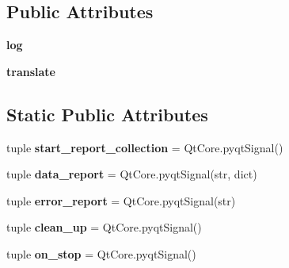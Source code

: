 \subsection*{Public Attributes}
\begin{DoxyCompactItemize}
\item 
\hypertarget{classcommotion__client_1_1extensions_1_1config__editor_1_1main_1_1ViewPort_a24d4aa0a151b0dca094f962f53936c73}{{\bfseries log}}\label{classcommotion__client_1_1extensions_1_1config__editor_1_1main_1_1ViewPort_a24d4aa0a151b0dca094f962f53936c73}

\item 
\hypertarget{classcommotion__client_1_1extensions_1_1config__editor_1_1main_1_1ViewPort_a83f08f61e1a063c32df35a7e1525951b}{{\bfseries translate}}\label{classcommotion__client_1_1extensions_1_1config__editor_1_1main_1_1ViewPort_a83f08f61e1a063c32df35a7e1525951b}

\end{DoxyCompactItemize}
\subsection*{Static Public Attributes}
\begin{DoxyCompactItemize}
\item 
\hypertarget{classcommotion__client_1_1extensions_1_1config__editor_1_1main_1_1ViewPort_a827b09211733037d237a251a8044ace2}{tuple {\bfseries start\+\_\+report\+\_\+collection} = Qt\+Core.\+pyqt\+Signal()}\label{classcommotion__client_1_1extensions_1_1config__editor_1_1main_1_1ViewPort_a827b09211733037d237a251a8044ace2}

\item 
\hypertarget{classcommotion__client_1_1extensions_1_1config__editor_1_1main_1_1ViewPort_acd90e59ae5c48843e70cacebfb578a29}{tuple {\bfseries data\+\_\+report} = Qt\+Core.\+pyqt\+Signal(str, dict)}\label{classcommotion__client_1_1extensions_1_1config__editor_1_1main_1_1ViewPort_acd90e59ae5c48843e70cacebfb578a29}

\item 
\hypertarget{classcommotion__client_1_1extensions_1_1config__editor_1_1main_1_1ViewPort_a56afd31e2d3659d6d6ac0b29368fe4a1}{tuple {\bfseries error\+\_\+report} = Qt\+Core.\+pyqt\+Signal(str)}\label{classcommotion__client_1_1extensions_1_1config__editor_1_1main_1_1ViewPort_a56afd31e2d3659d6d6ac0b29368fe4a1}

\item 
\hypertarget{classcommotion__client_1_1extensions_1_1config__editor_1_1main_1_1ViewPort_a90efecc3e2b13cfd791b7b5b2a48454a}{tuple {\bfseries clean\+\_\+up} = Qt\+Core.\+pyqt\+Signal()}\label{classcommotion__client_1_1extensions_1_1config__editor_1_1main_1_1ViewPort_a90efecc3e2b13cfd791b7b5b2a48454a}

\item 
\hypertarget{classcommotion__client_1_1extensions_1_1config__editor_1_1main_1_1ViewPort_afc73a9eca8862b7826782c586e43a275}{tuple {\bfseries on\+\_\+stop} = Qt\+Core.\+pyqt\+Signal()}\label{classcommotion__client_1_1extensions_1_1config__editor_1_1main_1_1ViewPort_afc73a9eca8862b7826782c586e43a275}

\end{DoxyCompactItemize}


